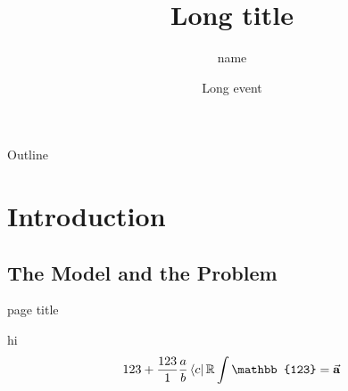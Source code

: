 \documentclass{beamer}
\title[Short title]{Long title}
\author[name]{name\inst{1}}
\institute[short inst]{\inst{1}Peking University, China}
\date[short event]{Long event}
\begin{document}
\begin{frame}
  \titlepage
\end{frame}

\begin{frame}{Outline}
  \tableofcontents
\end{frame}

\section{Introduction}

\subsection{The Model and the Problem}

\begin{frame}{page title}
    \begin{block}{hi}
        $$123 + \frac{123}{1}\frac{a}{b}\bra{c} \mathbb{R} \int{\mathbb{123}} = \va{a} $$
    \end{block}
\end{frame}
\end{document}
